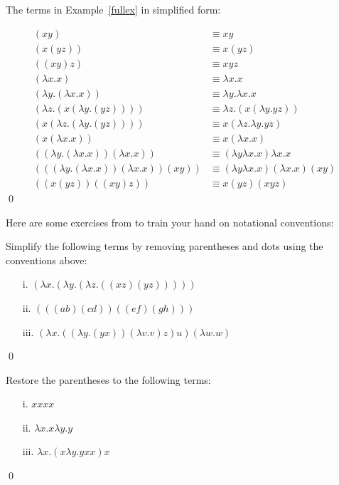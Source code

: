 \documentclass[11pt]{article}
\begin{document}
\begin{uexample}
The terms in Example~\ref{fullex} in simplified form:

\begin{align*}
(xy) &\equiv xy\\
(x(yz)) &\equiv x(yz)\\
((xy)z) &\equiv xyz\\
(\lambda x.x) &\equiv \lambda x.x\\
(\lambda y.(\lambda x.x)) &\equiv \lambda y.\lambda x.x\\
(\lambda z.(x(\lambda y.(yz)))) &\equiv \lambda z.(x(\lambda y.yz))\\
(x(\lambda z.(\lambda y.(yz)))) &\equiv x(\lambda z.\lambda y.yz)\\
(x(\lambda x.x)) &\equiv x(\lambda x.x)\\
((\lambda y.(\lambda x.x))(\lambda x.x)) &\equiv (\lambda y\lambda x.x)\lambda x.x\\
(((\lambda y.(\lambda x.x))(\lambda x.x))(xy)) &\equiv (\lambda y\lambda x.x)(\lambda x.x)(xy)\\
((x(yz))((xy)z)) &\equiv x(yz)(xyz)
\end{align*}
\qed
\end{uexample}

Here are some exercises from \cite{selinger13} to train your hand on notational conventions:

\begin{uexercise}
Simplify the following terms by removing parentheses and dots using the conventions above:
\begin{itemize}
\item[i.] $(\lambda x.(\lambda y.(\lambda z.((xz)(yz)))))$
\item[ii.] $(((ab)(cd))((ef)(gh)))$
\item[iii.] $(\lambda x.((\lambda y.(yx))(\lambda v.v)z)u)(\lambda w.w)$
\end{itemize}
\qed
\end{uexercise}

\begin{uexercise}
Restore the parentheses to the following terms:
\begin{itemize}
\item[i.] $xxxx$  
\item[ii.] $\lambda x.x\lambda y.y$ 
\item[iii.] $\lambda x.(x\lambda y.yxx)x$ 
\end{itemize}
\qed
\end{uexercise}
\end{document}
